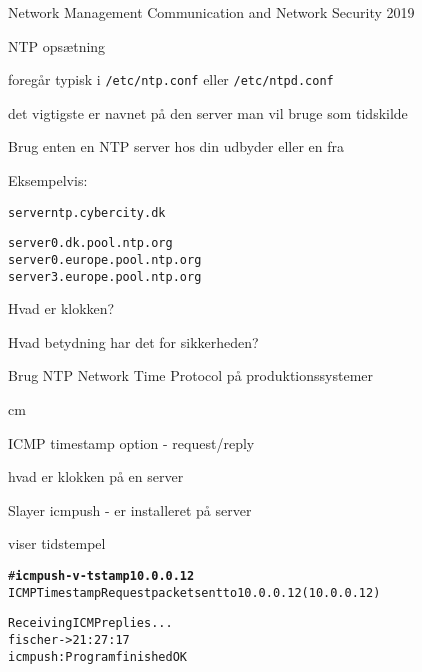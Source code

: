 \documentclass[Screen16to9,17pt,footrule]{foils}
\begin{document}
\mytitlepage
{Network Management}
{Communication and Network Security 2019}





\begin{list1}
\item NTP opsætning
\item foregår typisk i \verb+/etc/ntp.conf+ eller \verb+/etc/ntpd.conf+
\item det vigtigste er navnet på den server man vil bruge som tidskilde
\item Brug enten en NTP server hos din udbyder eller en fra 
\item Eksempelvis:
\end{list1}

\begin{alltt}
server ntp.cybercity.dk

server 0.dk.pool.ntp.org
server 0.europe.pool.ntp.org
server 3.europe.pool.ntp.org

\end{alltt}



\begin{list1}
\item Hvad er klokken?
\item Hvad betydning har det for sikkerheden?
\item Brug NTP Network Time Protocol på produktionssystemer
\end{list1}



 cm

\begin{list1}
  \item ICMP timestamp option - request/reply
\item hvad er klokken på en server
\item Slayer icmpush - er installeret på server
\item viser tidstempel
\end{list1}

\begin{alltt}
# {\bfseries icmpush -v -tstamp 10.0.0.12}
ICMP Timestamp Request packet sent to 10.0.0.12 (10.0.0.12)

Receiving ICMP replies ...
fischer         -> 21:27:17
icmpush: Program finished OK
\end{alltt}
\end{document}
